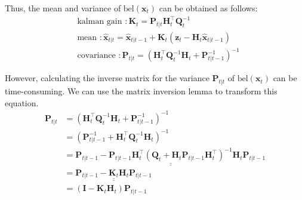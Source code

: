 \documentclass[10pt]{article}
\begin{document}
Thus, the mean and variance of $\text{bel}(\mathbf{x}_{t})$ can be obtained as follows:
\begin{equation}
	\boxed{ \begin{aligned}
			& \text{kalman gain }: \mathbf{K}_t = \mathbf{P}_{t|t} \mathbf{H}_t^{\intercal}\mathbf{Q}_t^{-1} \\
			& \text{mean }: \hat{\mathbf{x}}_{t|t} = \hat{\mathbf{x}}_{t|t-1} + \mathbf{K}_t(\mathbf{z}_t -   \mathbf{H}_t \hat{\mathbf{x}}_{t|t-1}) \\
			& \text{covariance }: \mathbf{P}_{t|t} = (\mathbf{H}_t^{\intercal}\mathbf{Q}_t^{-1}\mathbf{H}_t + \mathbf{P}_{t|t-1}^{-1})^{-1}
	\end{aligned} }
\end{equation}

However, calculating the inverse matrix for the variance $\mathbf{P}_{t|t}$ of $\text{bel}(\mathbf{x}_{t})$ can be time-consuming. We can use the matrix inversion lemma to transform this equation.
\begin{equation} \label{eq:derivkf6}
	\begin{aligned} 
		\mathbf{P}_{t|t} & = (\mathbf{H}_t^{\intercal}\mathbf{Q}_t^{-1}\mathbf{H}_t + \mathbf{P}_{t|t-1}^{-1})^{-1} \\
		& = (\mathbf{P}_{t|t-1}^{-1} + \mathbf{H}_t^{\intercal}\mathbf{Q}_t^{-1}\mathbf{H}_t)^{-1} \\
		& = \mathbf{P}_{t|t-1} - \underline{\underline{ \mathbf{P}_{t|t-1}\mathbf{H}_t^{\intercal}(\mathbf{Q}_t + \mathbf{H}_t\mathbf{P}_{t|t-1}\mathbf{H}_t^{\intercal})^{-1} }} \mathbf{H}_t \mathbf{P}_{t|t-1} \\ 
		& = \mathbf{P}_{t|t-1} - \underline{\underline{ \mathbf{K}_t }} \mathbf{H}_t \mathbf{P}_{t|t-1} \\
		& = (\mathbf{I} - \mathbf{K}_t\mathbf{H}_t) \mathbf{P}_{t|t-1}
	\end{aligned} 
\end{equation}
\end{document}
